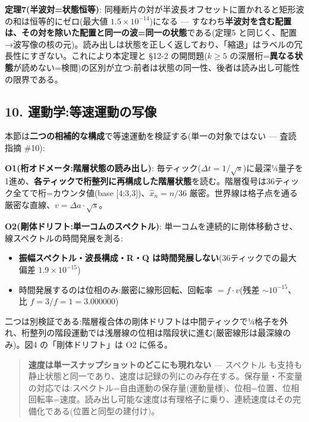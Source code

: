 \documentclass[
]{ltjsarticle}
\providecommand{\tightlist}{%
  \setlength{\itemsep}{0pt}\setlength{\parskip}{0pt}}
\begin{document}
\textbf{定理7(半波対=状態恒等)}:
同種断片の対が半波長オフセットに置かれると矩形波の和は恒等的にゼロ(最大値
\(1.5\times10^{-14}\))になる ---
すなわち\textbf{半波対を含む配置は、その対を除いた配置と同一の波=同一の状態}である(定理5
と同じく、配置→波写像の核の元)。読み出しは状態を正しく返しており、「縮退」はラベルの冗長性にすぎない。これにより本定理と
§12-2 の開問題(\(k\ge5\)
の深層桁=\textbf{異なる状態}が読めない=検閲)の区別が立つ:前者は状態の同一性、後者は読み出し可能性の限界である。

\subsection{10.
運動学:等速運動の写像}\label{ux904bux52d5ux5b66ux7b49ux901fux904bux52d5ux306eux5199ux50cf}

本節は\textbf{二つの相補的な構成}で等速運動を検証する(単一の対象ではない
--- 査読指摘 \#10):

\textbf{O1(桁オドメータ:階層状態の読み出し)}:
毎ティック(\(\Delta t=1/\sqrt s\))に最深¼量子を1進め、\textbf{各ティックで桁整列に再構成した階層状態}を読む。階層復号は36ティック全てで桁=カウンタ値(base
{[}4;3,3{]})、\(\hat x_n=n/36\)
厳密。世界線は格子点を通る厳密な直線、\(v=\Delta a\cdot\sqrt s\)。

\textbf{O2(剛体ドリフト:単一コムのスペクトル)}:
単一コムを連続的に剛体移動させ、線スペクトルの時間発展を測る:

\begin{itemize}
\tightlist
\item
  \textbf{振幅スペクトル・波長構成・R・Q
  は時間発展しない}(36ティックでの最大偏差 \(1.9\times10^{-15}\))
\item
  時間発展するのは位相のみ:厳密に線形回転、回転率 \(=f\cdot v\)(残差
  \(\sim10^{-15}\)、比 \(f{=}3/f{=}1=3.000000\))
\end{itemize}

二つは別検証である:階層複合体の剛体ドリフトは中間ティックで¼格子を外れ、桁整列の階段運動では浅層線の位相は階段状に進む(厳密線形は最深線のみ)。図4
の「剛体ドリフト」は O2 に係る。

\begin{quote}
\textbf{速度は単一スナップショットのどこにも現れない} ---
\textbar スペクトル\textbar{}
も支持も静止状態と同一であり、速度は記録の列にのみ存在する。保存量・不変量の対応では:\textbar スペクトル\textbar=自由運動の保存量(運動量様)、位相=位置、位相回転率=速度。読み出し可能な速度は有理格子に乗り、連続速度はその完備化である(位置と同型の建付け)。
\end{quote}
\end{document}
